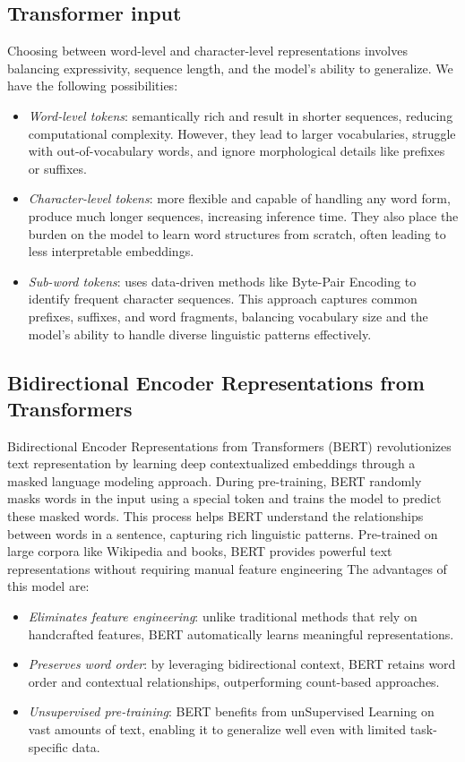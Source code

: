 \subsection{Transformer input}
Choosing between word-level and character-level representations involves balancing expressivity, sequence length, and the model's ability to generalize.
We have the following possibilities: 
\begin{itemize}
    \item \textit{Word-level tokens}: semantically rich and result in shorter sequences, reducing computational complexity. 
        However, they lead to larger vocabularies, struggle with out-of-vocabulary words, and ignore morphological details like prefixes or suffixes.
    \item \textit{Character-level tokens}: more flexible and capable of handling any word form, produce much longer sequences, increasing inference time.
        They also place the burden on the model to learn word structures from scratch, often leading to less interpretable embeddings.
    \item \textit{Sub-word tokens}: uses data-driven methods like Byte-Pair Encoding to identify frequent character sequences. 
    This approach captures common prefixes, suffixes, and word fragments, balancing vocabulary size and the model's ability to handle diverse linguistic patterns effectively.
\end{itemize}

\subsection{Bidirectional Encoder Representations from Transformers}
Bidirectional Encoder Representations from Transformers (BERT) revolutionizes text representation by learning deep contextualized embeddings through a masked language modeling approach.
During pre-training, BERT randomly masks words in the input using a special token and trains the model to predict these masked words.
This process helps BERT understand the relationships between words in a sentence, capturing rich linguistic patterns. 
Pre-trained on large corpora like Wikipedia and books, BERT provides powerful text representations without requiring manual feature engineering
The advantages of this model are: 
\begin{itemize}
    \item \textit{Eliminates feature engineering}: unlike traditional methods that rely on handcrafted features, BERT automatically learns meaningful representations.
    \item \textit{Preserves word order}: by leveraging bidirectional context, BERT retains word order and contextual relationships, outperforming count-based approaches.
    \item \textit{Unsupervised pre-training}: BERT benefits from unSupervised Learning on vast amounts of text, enabling it to generalize well even with limited task-specific data.
\end{itemize}


